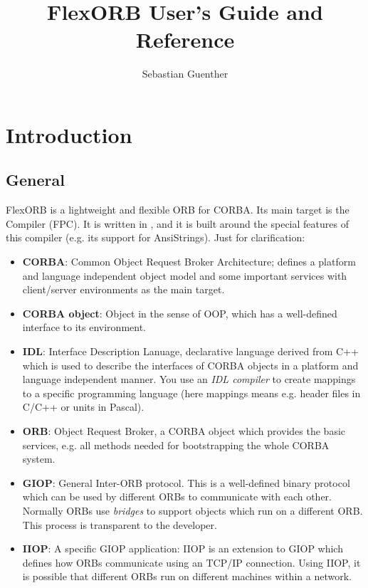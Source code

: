\documentclass{report}
\begin{document}
\author{Sebastian Guenther}
\title{FlexORB User's Guide and Reference}
\maketitle
\tableofcontents

\chapter{Introduction}


\section{General}
FlexORB is a lightweight and flexible ORB for CORBA. Its main target is the \fpc
Compiler (FPC). It is written in \fpc, and it is built around the special
features of this compiler (e.g. its support for AnsiStrings).
\newline Just for clarification:
\begin{itemize}
\item \textbf{CORBA}: Common Object Request Broker Architecture; defines a
      platform and language independent object model and some important services
      with client/server environments as the main target.
\item \textbf{CORBA object}: Object in the sense of OOP, which has a
      well-defined interface to its environment.
\item \textbf{IDL}: Interface Description Lanuage, declarative language derived
      from C++ which is used to describe the interfaces of CORBA objects in a
      platform and language independent manner. You use an \textit{IDL compiler}
      to create mappings to a specific programming language (here mappings means
      e.g. header files in C/C++ or units in Pascal).
\item \textbf{ORB}: Object Request Broker, a CORBA object which provides the basic
      services, e.g. all methods needed for bootstrapping the whole CORBA
      system.
\item \textbf{GIOP}: General Inter-ORB protocol. This is a well-defined binary
      protocol which can be used by different ORBs to communicate with each
      other.
      Normally ORBs use \textit{bridges} to support objects which run on a
      different ORB. This process is transparent to the developer.
\item \textbf{IIOP}: A specific GIOP application: IIOP is an extension to GIOP
      which defines how ORBs communicate using an TCP/IP connection. Using IIOP,
      it is possible that different ORBs run on different machines within a
      network.
\end{itemize}
\end{document}
